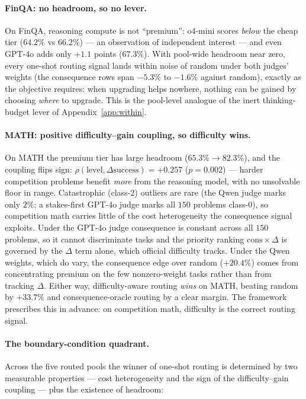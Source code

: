 \documentclass{article}
\begin{document}
\paragraph{FinQA: no headroom, so no lever.} On FinQA, reasoning
compute is not ``premium'': o4-mini scores \emph{below} the cheap
tier ($64.2\%$ vs $66.2\%$) --- an observation of independent
interest --- and even GPT-4o adds only $+1.1$ points ($67.3\%$).
With pool-wide headroom near zero, every one-shot routing signal
lands within noise of random under both judges' weights (the
consequence rows span $-5.3\%$ to $-1.6\%$ against random), exactly
as the objective requires: when upgrading helps nowhere, nothing can
be gained by choosing \emph{where} to upgrade. This is the
pool-level analogue of the inert thinking-budget lever of
Appendix~\ref{app:within}.

\paragraph{MATH: positive difficulty--gain coupling, so difficulty
wins.} On MATH the premium tier has large headroom ($65.3\% \to
82.3\%$), and the coupling flips sign:
$\rho(\mathrm{level}, \Delta\mathrm{success}) = +0.257$
($p = 0.002$) --- harder competition problems benefit \emph{more}
from the reasoning model, with no unsolvable floor in range.
Catastrophic (class-$2$) outliers are rare (the Qwen judge marks only
$2\%$; a stakes-first GPT-4o judge marks all $150$ problems class-$0$),
so competition math carries little of the cost heterogeneity the
consequence signal exploits. Under the GPT-4o judge consequence is
constant across all $150$ problems, so it cannot discriminate tasks and
the priority ranking $\mathrm{cons}\times\Delta$ is governed by the
$\Delta$ term alone, which official difficulty tracks. Under the Qwen
weights, which do vary, the consequence edge over random ($+20.4\%$)
comes from concentrating premium on the few nonzero-weight tasks rather
than from tracking $\Delta$. Either
way, difficulty-aware routing \emph{wins} on MATH, beating random by
$+33.7\%$ and consequence-oracle routing by a clear margin. The framework
prescribes this in advance: on competition math, difficulty is the
correct routing signal.

\paragraph{The boundary-condition quadrant.} Across the five routed pools
the winner of one-shot routing is determined by two measurable
properties --- cost heterogeneity and the sign of the
difficulty--gain coupling --- plus the existence of headroom:
\end{document}
